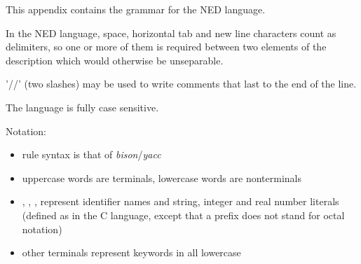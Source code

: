 \label{cha:ned-language-grammar}

This appendix contains the grammar for the NED language.

In the NED language, space, horizontal tab and new line characters count
as delimiters, so one or more of them is required between two elements of the
description which would otherwise be unseparable.

'//' (two slashes) may be used to write comments that last to the end of the line.

The language is fully case sensitive.

Notation:
\begin{itemize}
  \item{rule syntax is that of \textit{bison}/\textit{yacc}}
  \item{uppercase words are terminals, lowercase words are nonterminals}
  \item{, , ,
         represent identifier names and string,
        integer and real number literals (defined as in the C language,
        except that a  prefix does not stand for octal notation)}
  \item{other terminals represent keywords in all lowercase}
\end{itemize}


%
%
%
%
%

